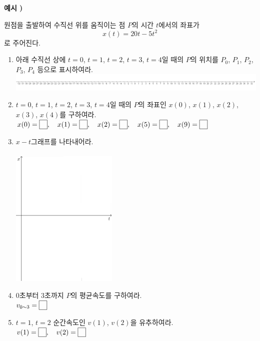 \documentclass{oblivoir}
\newcounter{num}
\newcommand\exam[1]
{\bigskip\par\noindent\stepcounter{num} \textbf{예시 \thenum) #1}\par\noindent}
\newcommand\pb[1]{\ensuremath{\fbox{\phantom{#1}}}}
\begin{document}
\clearpage
%
\exam{}
원점을 출발하여 수직선 위를 움직이는 점 \(P\)의 시간 \(t\)에서의 좌표가
\[x(t)=20t-5t^2\]
로 주어진다.
\begin{enumerate}[label=(\(\arabic*\))]
\item
아래 수직선 상에 \(t=0\), \(t=1\), \(t=2\), \(t=3\), \(t=4\)일 때의 \(P\)의 위치를 \(P_0\), \(P_1\), \(P_2\), \(P_3\), \(P_4\) 등으로 표시하여라.\\
\includegraphics[width=1.3\textwidth]{line2}
\item
\(t=0\), \(t=1\), \(t=2\), \(t=3\), \(t=4\)일 때의 \(P\)의 좌표인 \(x(0)\), \(x(1)\), \(x(2)\), \(x(3)\), \(x(4)\)를 구하여라.\\
\(x(0)=\pb{1},\quad x(1)=\pb{1},\quad x(2)=\pb{1},\quad x(5)=\pb{1},\quad x(9)=\pb{1}\)
\item
\(x-t\)그래프를 나타내어라.\\\\
\includegraphics[width=0.4\textwidth]{xt}
\item
\(0\)초부터 \(3\)초까지 \(P\)의 평균속도를 구하여라.\\
\(v_{0\sim3}=\pb{1}\)
\item
\(t=1\), \(t=2\) 순간속도인 \(v(1)\), \(v(2)\)을 유추하여라.\\
\(v(1)=\pb{1},\quad v(2)=\pb{1}\)
\end{enumerate}
\end{document}
